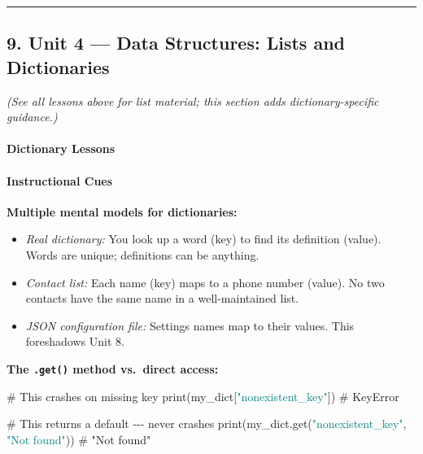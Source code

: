 \documentclass[
  justified,
  openright,
]{tufte-book}
\let\subsubsection\paragraph
\let\paragraph\paragraph
\newcommand{\BuiltInTok}[1]{#1}
\newcommand{\CommentTok}[1]{\textcolor{MidGray}{#1}}
\newcommand{\NormalTok}[1]{#1}
\newcommand{\StringTok}[1]{\textcolor{Teal}{#1}}
\newenvironment{Shaded}{%
  \begin{snugshade}
}{%
  \end{snugshade}
}
\let\subsubsection\paragraph
\let\paragraph\paragraph
\providecommand{\tightlist}{%
  \setlength{\itemsep}{0pt}\setlength{\parskip}{0pt}}
\begin{document}
\begin{center}\rule{0.5\linewidth}{0.5pt}\end{center}

\subsection{9. Unit 4 --- Data Structures: Lists and
Dictionaries}\label{unit-4-data-structures-lists-and-dictionaries}

\emph{(See all lessons above for list material; this section adds
dictionary-specific guidance.)}

\subsubsection{Dictionary Lessons}\label{dictionary-lessons}

\paragraph{Instructional Cues}\label{instructional-cues-10}

\textbf{Multiple mental models for dictionaries:}

\begin{itemize}
\tightlist
\item
  \emph{Real dictionary:} You look up a word (key) to find its
  definition (value). Words are unique; definitions can be anything.
\item
  \emph{Contact list:} Each name (key) maps to a phone number (value).
  No two contacts have the same name in a well-maintained list.
\item
  \emph{JSON configuration file:} Settings names map to their values.
  This foreshadows Unit 8.
\end{itemize}

\textbf{The \texttt{.get()} method vs.~direct access:}

\begin{Shaded}
\begin{Highlighting}[]
\CommentTok{\# This crashes on missing key}
\BuiltInTok{print}\NormalTok{(my\_dict[}\StringTok{"nonexistent\_key"}\NormalTok{])   }\CommentTok{\# KeyError}

\CommentTok{\# This returns a default {-}{-}{-} never crashes}
\BuiltInTok{print}\NormalTok{(my\_dict.get(}\StringTok{"nonexistent\_key"}\NormalTok{, }\StringTok{"Not found"}\NormalTok{))  }\CommentTok{\# "Not found"}
\end{Highlighting}
\end{Shaded}
\end{document}
